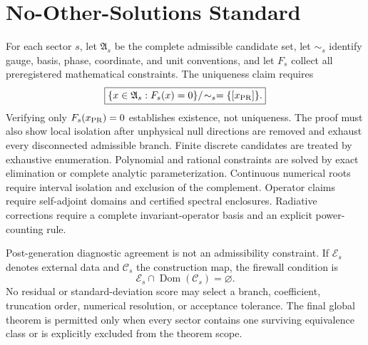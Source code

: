 \section{No-Other-Solutions Standard}
\label{sec:pr35-no-other-solutions-standard}

For each sector $s$, let \(\mathfrak A_s\) be the complete admissible
candidate set, let \(\sim_s\) identify gauge, basis, phase, coordinate, and
unit conventions, and let \(F_s\) collect all preregistered mathematical
constraints.  The uniqueness claim requires
\begin{equation}
\boxed{
\{x\in\mathfrak A_s:F_s(x)=0\}/\!\sim_s
=
\{[x_{\rm PR}]\}.}
\label{eq:pr35-sector-uniqueness-standard}
\end{equation}
Verifying only \(F_s(x_{\rm PR})=0\) establishes existence, not uniqueness. The proof must also show local isolation after unphysical null directions are removed and exhaust every disconnected admissible branch. Finite discrete candidates are treated by exhaustive enumeration. Polynomial and rational constraints are solved by exact elimination or complete analytic parameterization. Continuous numerical roots require interval isolation and exclusion of the complement. Operator claims require self-adjoint domains and certified spectral enclosures. Radiative corrections require a complete invariant-operator basis and an explicit power-counting rule.

Post-generation diagnostic agreement is not an admissibility constraint. If \(\mathcal E_s\) denotes external data and \(\mathcal C_s\) the construction map, the firewall condition is 
\begin{equation}
\mathcal E_s\cap\operatorname{Dom}(\mathcal C_s)=\varnothing .
\end{equation}
No residual or standard-deviation score may select a branch, coefficient, truncation order, numerical resolution, or acceptance tolerance. The final global theorem is permitted only when every sector contains one surviving equivalence class or is explicitly excluded from the theorem scope.
